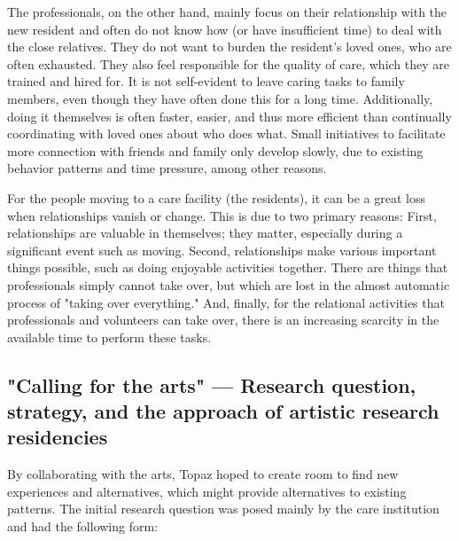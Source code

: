 \documentclass[authordate, empirical]{jote-new-article}
\begin{document}
	The professionals, on the other hand, mainly focus on their relationship with the new resident and often do not know how (or have insufficient time) to deal with the close relatives. They do not want to burden the resident's loved ones, who are often exhausted. They also feel responsible for the quality of care, which they are trained and hired for. It is not self-evident to leave caring tasks to family members, even though they have often done this for a long time. Additionally, doing it themselves is often faster, easier, and thus more efficient than continually coordinating with loved ones about who does what. Small initiatives to facilitate more connection with friends and family only develop slowly, due to existing behavior patterns and time pressure, among other reasons.







	For the people moving to a care facility (the residents), it can be a great loss when relationships vanish or change. This is due to two primary reasons: First, relationships are valuable in themselves; they matter, especially during a significant event such as moving. Second, relationships make various important things possible, such as doing enjoyable activities together. There are things that professionals simply cannot take over, but which are lost in the almost automatic process of "taking over everything." And, finally, for the relational activities that professionals and volunteers can take over, there is an increasing scarcity in the available time to perform these tasks.







	\subsection{"Calling for the arts" — Research question, strategy, and the approach of artistic research residencies}







	By collaborating with the arts, Topaz hoped to create room to find new experiences and alternatives, which might provide alternatives to existing patterns. The initial research question was posed mainly by the care institution and had the following form:
\end{document}
